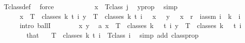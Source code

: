 \begin{isabellebody}
\ T{\isacharunderscore}{\kern0pt}class{\isacharunderscore}{\kern0pt}def\ \isamarkupfalse%
\ force\isanewline
\ \ \ \ \ \ \ \ \isamarkupfalse%
\ \isamarkupfalse%
\ {\isachardoublequoteopen}x\ {\isasymin}\ T{\isacharunderscore}{\kern0pt}class\ j{\isachardoublequoteclose}\ \isamarkupfalse%
\ y{\isacharunderscore}{\kern0pt}prop\ \isamarkupfalse%
\ simp\isanewline
\ \ \ \ \ \ \isamarkupfalse%
\isanewline
\ \ \ \ \isamarkupfalse%
\isanewline
\ \ \ \ \ \ \isanewline
\ \ \ \ \isamarkupfalse%
\ {\isachardoublequoteopen}{\isasymforall}x\ {\isasymin}\ T\ {\isacharbackquote}{\kern0pt}\ classes\ {\isacharparenleft}{\kern0pt}k{\isacharplus}{\kern0pt}{}{\isacharparenright}{\kern0pt}\ t\ i{\isachardot}{\kern0pt}\ {\isasymforall}y\ {\isasymin}\ T\ {\isacharbackquote}{\kern0pt}\ classes\ {\isacharparenleft}{\kern0pt}k{\isacharplus}{\kern0pt}{}{\isacharparenright}{\kern0pt}\ t\ i{\isachardot}{\kern0pt}\ \ {\isasymchi}\ x\ {\isacharequal}{\kern0pt}\ {\isasymchi}\ y\ {\isasymand}\ {\isasymchi}\ x\ {\isacharless}{\kern0pt}\ r{\isachardoublequoteclose}\ \ i{\isacharunderscore}{\kern0pt}assm{\isacharcolon}{\kern0pt}\ {\isachardoublequoteopen}i\ {\isasymle}\ k{\isachardoublequoteclose}\ \ i\isanewline
\ \ \ \ \isamarkupfalse%
\ {\isacharparenleft}{\kern0pt}intro\ ballI{\isacharparenright}{\kern0pt}\isanewline
\ \ \ \ \ \ \isamarkupfalse%
\ x\ y\ \isamarkupfalse%
\ a{\isacharcolon}{\kern0pt}\ {\isachardoublequoteopen}x\ {\isasymin}\ T\ {\isacharbackquote}{\kern0pt}\ classes\ {\isacharparenleft}{\kern0pt}k\ {\isacharplus}{\kern0pt}\ {}{\isacharparenright}{\kern0pt}\ t\ i{\isachardoublequoteclose}\ {\isachardoublequoteopen}y\ {\isasymin}\ T\ {\isacharbackquote}{\kern0pt}\ classes\ {\isacharparenleft}{\kern0pt}k\ {\isacharplus}{\kern0pt}\ {}{\isacharparenright}{\kern0pt}\ t\ i{\isachardoublequoteclose}\isanewline
\ \ \ \ \ \ \isamarkupfalse%
\ that\ \isamarkupfalse%
\ {\isacharasterisk}{\kern0pt}{\isacharcolon}{\kern0pt}\ {\isachardoublequoteopen}T\ {\isacharbackquote}{\kern0pt}\ classes\ {\isacharparenleft}{\kern0pt}k{\isacharplus}{\kern0pt}{}{\isacharparenright}{\kern0pt}\ t\ i\ {\isacharequal}{\kern0pt}\ T{\isacharunderscore}{\kern0pt}class\ i{\isachardoublequoteclose}\ \isamarkupfalse%
\ {\isacharparenleft}{\kern0pt}simp\ add{\isacharcolon}{\kern0pt}\ classprop{\isacharparenright}{\kern0pt}\isanewline

\end{isabellebody}
